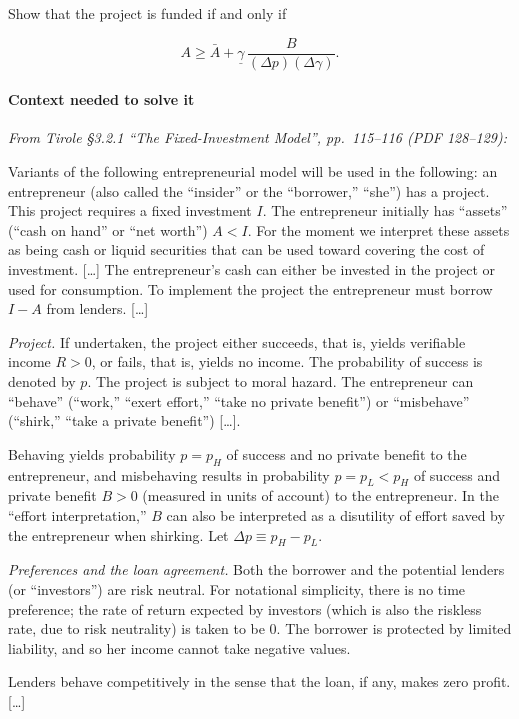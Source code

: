 \documentclass[11pt,a4paper]{article}
\begin{document}
Show that the project is funded if and only if

\[A \geqslant \bar A + \underline{\gamma}\,\frac{B}{(\Delta p)(\Delta\gamma)}.\]

\paragraph{Context needed to solve it}

\emph{From Tirole §3.2.1 ``The Fixed-Investment Model'', pp.~115--116 (PDF 128--129):}

Variants of the following entrepreneurial model will be used in the following: an entrepreneur (also
called the ``insider'' or the ``borrower,'' ``she'') has a project. This project requires a fixed
investment \(I\). The entrepreneur initially has ``assets'' (``cash on hand'' or ``net worth'')
\(A < I\). For the moment we interpret these assets as being cash or liquid securities that can be
used toward covering the cost of investment. {[}\ldots{]} The entrepreneur's cash can either be
invested in the project or used for consumption. To implement the project the entrepreneur must
borrow \(I - A\) from lenders. {[}\ldots{]}

\emph{Project.} If undertaken, the project either succeeds, that is, yields verifiable income
\(R > 0\), or fails, that is, yields no income. The probability of success is denoted by \(p\). The
project is subject to moral hazard. The entrepreneur can ``behave'' (``work,'' ``exert effort,''
``take no private benefit'') or ``misbehave'' (``shirk,'' ``take a private benefit'') {[}\ldots{]}.

Behaving yields probability \(p = p_H\) of success and no private benefit to the entrepreneur, and
misbehaving results in probability \(p = p_L < p_H\) of success and private benefit \(B > 0\)
(measured in units of account) to the entrepreneur. In the ``effort interpretation,'' \(B\) can also
be interpreted as a disutility of effort saved by the entrepreneur when shirking. Let
\(\Delta p \equiv p_H - p_L\).

\emph{Preferences and the loan agreement.} Both the borrower and the potential lenders (or
``investors'') are risk neutral. For notational simplicity, there is no time preference; the rate of
return expected by investors (which is also the riskless rate, due to risk neutrality) is taken to
be 0. The borrower is protected by limited liability, and so her income cannot take negative values.

Lenders behave competitively in the sense that the loan, if any, makes zero profit. {[}\ldots{]}
\end{document}
